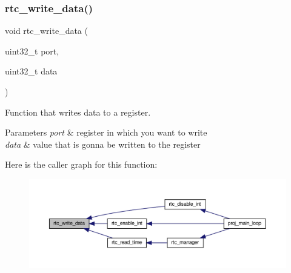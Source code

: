 \subsubsection{\texorpdfstring{rtc\+\_\+write\+\_\+data()}{rtc\_write\_data()}}
{\footnotesize\ttfamily void rtc\+\_\+write\+\_\+data (\begin{DoxyParamCaption}\item[{uint32\+\_\+t}]{port,  }\item[{uint32\+\_\+t}]{data }\end{DoxyParamCaption})}



Function that writes data to a register. 


\begin{DoxyParams}{Parameters}
{\em port} & register in which you want to write \\
\hline
{\em data} & value that is gonna be written to the register \\
\hline
\end{DoxyParams}
Here is the caller graph for this function\+:
\nopagebreak
\begin{figure}[H]
\begin{center}
\leavevmode
\includegraphics[width=350pt]{group__rtc_gade198e3189c6f8195cde4e404671f980_icgraph}
\end{center}
\end{figure}
